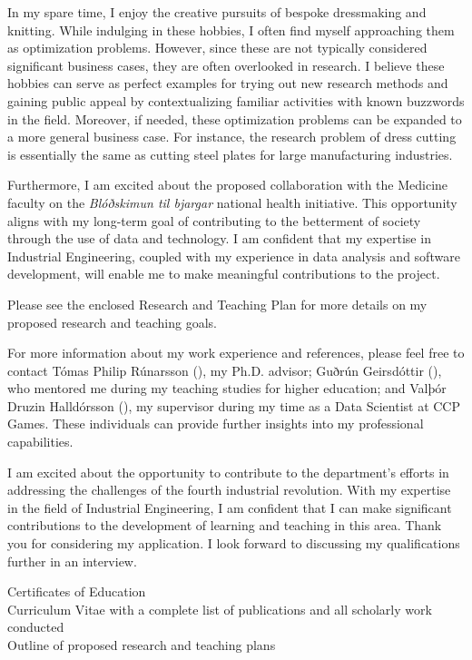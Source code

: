 \documentclass{cover}
\begin{document}
{In my spare time, I enjoy the creative pursuits of bespoke dressmaking and knitting. While indulging in these hobbies, I often find myself approaching them as optimization problems. However, since these are not typically considered significant business cases, they are often overlooked in research. I believe these hobbies can serve as perfect examples for trying out new research methods and gaining public appeal by contextualizing familiar activities with known buzzwords in the field. Moreover, if needed, these optimization problems can be expanded to a more general business case. For instance, the research problem of dress cutting is essentially the same as cutting steel plates for large manufacturing industries.


Furthermore, I am excited about the proposed collaboration with the Medicine faculty on the \textit{Blóðskimun til bjargar} national health initiative. This opportunity aligns with my long-term goal of contributing to the betterment of society through the use of data and technology. I am confident that my expertise in Industrial Engineering, coupled with my experience in data analysis and software development, will enable me to make meaningful contributions to the project.

Please see the enclosed Research and Teaching Plan for more details on my proposed research and teaching goals.


For more information about my work experience and references, please feel free to contact Tómas Philip Rúnarsson (), my Ph.D. advisor; Guðrún Geirsdóttir (), who mentored me during my teaching studies for higher education; and Valþór Druzin Halldórsson (), my supervisor during my time as a Data Scientist at CCP Games. These individuals can provide further insights into my professional capabilities.


I am excited about the opportunity to contribute to the department's efforts in addressing the challenges of the fourth industrial revolution. With my expertise in the field of Industrial Engineering, I am confident that I can make significant contributions to the development of learning and teaching in this area.
Thank you for considering my application. I look forward to discussing my qualifications further in an interview.

}{
Certificates of Education\\
Curriculum Vitae with a complete list of publications and all scholarly work conducted\\
Outline of proposed research and teaching plans}
\end{document}
